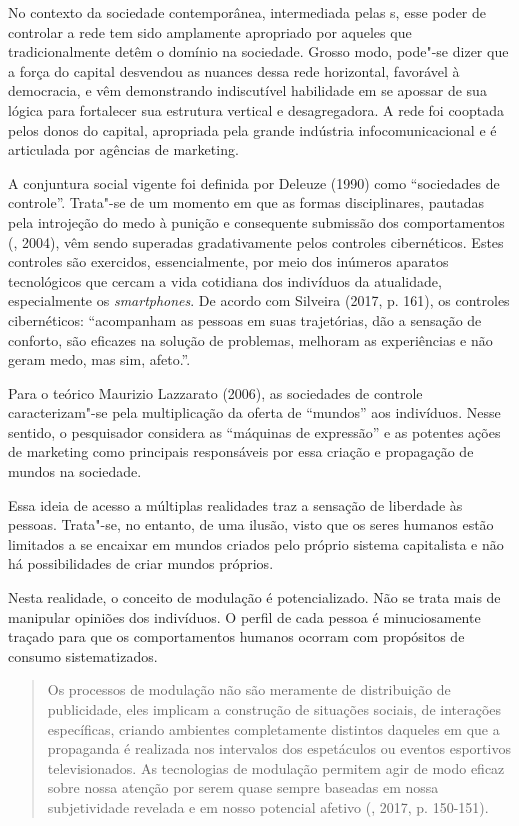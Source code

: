 No contexto da sociedade contemporânea, intermediada pelas s, esse
poder de controlar a rede tem sido amplamente apropriado por aqueles que
tradicionalmente detêm o domínio na sociedade. Grosso modo, pode"-se
dizer que a força do capital desvendou as nuances dessa rede horizontal,
favorável à democracia, e vêm demonstrando indiscutível habilidade em se
apossar de sua lógica para fortalecer sua estrutura vertical e
desagregadora. A rede foi cooptada pelos donos do capital, apropriada
pela grande indústria infocomunicacional e é articulada por agências de
marketing.

A conjuntura social vigente foi definida por Deleuze (1990) como
``sociedades de controle''. Trata"-se de um momento em que as formas
disciplinares, pautadas pela introjeção do medo à punição e consequente
submissão dos comportamentos (, 2004), vêm sendo superadas
gradativamente pelos controles cibernéticos. Estes controles são
exercidos, essencialmente, por meio dos inúmeros aparatos tecnológicos
que cercam a vida cotidiana dos indivíduos da atualidade, especialmente
os \emph{smartphones}. De acordo com Silveira (2017, p. 161), os
controles cibernéticos: ``acompanham as pessoas em suas trajetórias, dão
a sensação de conforto, são eficazes na solução de problemas, melhoram
as experiências e não geram medo, mas sim, afeto.''.

Para o teórico Maurizio Lazzarato (2006), as sociedades de controle
caracterizam"-se pela multiplicação da oferta de ``mundos'' aos
indivíduos. Nesse sentido, o pesquisador considera as ``máquinas de
expressão'' e as potentes ações de marketing como principais
responsáveis por essa criação e propagação de mundos na sociedade.

Essa ideia de acesso a múltiplas realidades traz a sensação de liberdade
às pessoas. Trata"-se, no entanto, de uma ilusão, visto que os seres
humanos estão limitados a se encaixar em mundos criados pelo próprio
sistema capitalista e não há possibilidades de criar mundos próprios.

Nesta realidade, o conceito de modulação é potencializado. Não se trata
mais de manipular opiniões dos indivíduos. O perfil de cada pessoa é
minuciosamente traçado para que os comportamentos humanos ocorram com
propósitos de consumo sistematizados.

\begin{quote}
Os processos de modulação não são meramente de distribuição de
publicidade, eles implicam a construção de situações sociais, de
interações específicas, criando ambientes completamente distintos
daqueles em que a propaganda é realizada nos intervalos dos espetáculos
ou eventos esportivos televisionados. As tecnologias de modulação
permitem agir de modo eficaz sobre nossa atenção por serem quase sempre
baseadas em nossa subjetividade revelada e em nosso potencial afetivo (, 2017, p. 150-151).
\end{quote}


